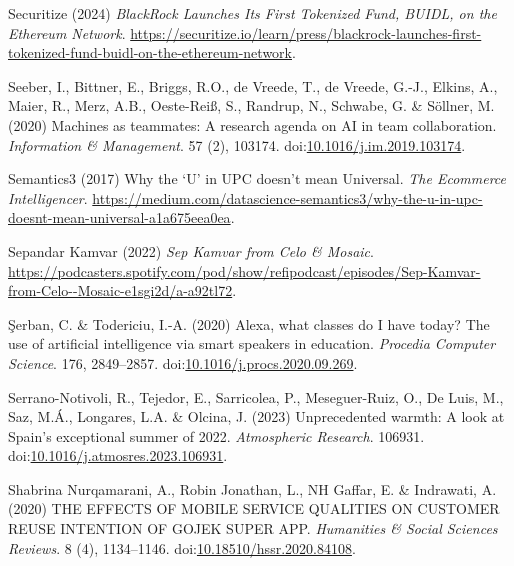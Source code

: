 \documentclass[
  letterpaper,
  DIV=11,
  numbers=noendperiod]{scrartcl}
\newlength{\cslhangindent}
\newenvironment{CSLReferences}[2] %
 {\begin{list}{}{%
  \setlength{\itemindent}{0pt}
  \setlength{\leftmargin}{0pt}
  \setlength{\parsep}{0pt}
  \ifodd #1
   \setlength{\leftmargin}{\cslhangindent}
   \setlength{\itemindent}{-1\cslhangindent}
  \fi
  \setlength{\itemsep}{#2\baselineskip}}}
 {\end{list}}
\begin{document}
\begin{CSLReferences}{0}{1}
Securitize (2024) \emph{{BlackRock Launches Its First Tokenized Fund},
{BUIDL}, on the {Ethereum Network}}.
\url{https://securitize.io/learn/press/blackrock-launches-first-tokenized-fund-buidl-on-the-ethereum-network}.

Seeber, I., Bittner, E., Briggs, R.O., de Vreede, T., de Vreede, G.-J.,
Elkins, A., Maier, R., Merz, A.B., Oeste-Reiß, S., Randrup, N., Schwabe,
G. \& Söllner, M. (2020) Machines as teammates: {A} research agenda on
{AI} in team collaboration. \emph{Information \& Management}. 57 (2),
103174.
doi:\href{https://doi.org/10.1016/j.im.2019.103174}{10.1016/j.im.2019.103174}.

Semantics3 (2017) Why the {`{U}'} in {UPC} doesn't mean {Universal}.
\emph{The Ecommerce Intelligencer}.
\url{https://medium.com/datascience-semantics3/why-the-u-in-upc-doesnt-mean-universal-a1a675eea0ea}.

Sepandar Kamvar (2022) \emph{Sep {Kamvar} from {Celo} \& {Mosaic}}.
\url{https://podcasters.spotify.com/pod/show/refipodcast/episodes/Sep-Kamvar-from-Celo--Mosaic-e1sgi2d/a-a92tl72}.

Şerban, C. \& Todericiu, I.-A. (2020) Alexa, what classes do {I} have
today? {The} use of artificial intelligence via smart speakers in
education. \emph{Procedia Computer Science}. 176, 2849--2857.
doi:\href{https://doi.org/10.1016/j.procs.2020.09.269}{10.1016/j.procs.2020.09.269}.

Serrano-Notivoli, R., Tejedor, E., Sarricolea, P., Meseguer-Ruiz, O., De
Luis, M., Saz, M.Á., Longares, L.A. \& Olcina, J. (2023) Unprecedented
warmth: {A} look at {Spain}'s exceptional summer of 2022.
\emph{Atmospheric Research}. 106931.
doi:\href{https://doi.org/10.1016/j.atmosres.2023.106931}{10.1016/j.atmosres.2023.106931}.

Shabrina Nurqamarani, A., Robin Jonathan, L., NH Gaffar, E. \&
Indrawati, A. (2020) {THE EFFECTS OF MOBILE SERVICE QUALITIES ON
CUSTOMER REUSE INTENTION OF GOJEK SUPER APP}. \emph{Humanities \& Social
Sciences Reviews}. 8 (4), 1134--1146.
doi:\href{https://doi.org/10.18510/hssr.2020.84108}{10.18510/hssr.2020.84108}.


\end{CSLReferences}
\end{document}

